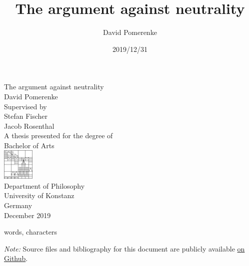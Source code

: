 \documentclass{report}
\title{The argument against neutrality}
\author{David Pomerenke}
\date{2019/12/31}
\begin{document}
\begin{titlepage}
    \begin{center}
        \vspace*{1cm}
        \huge
        The argument against neutrality\\
        \large
        David Pomerenke\\
        \vfill
        Supervised by\\
        Stefan Fischer\\
        Jacob Rosenthal\\
        \vfill
        A thesis presented for the degree of\\
        Bachelor of Arts\\
        \vfill
        \includegraphics[width=1.5cm]{0-logo.png}\\
        Department of Philosophy\\
        University of Konstanz\\
        Germany\\
        December 2019\\
    \end{center}
\end{titlepage}

\tableofcontents









 words,
 characters
\cite{pomerenke_nach_2017}




\emph{Note:} Source files and bibliography for this document are publicly available \href{https://github.com/davidpomerenke/ba}{on Github}.
\end{document}
